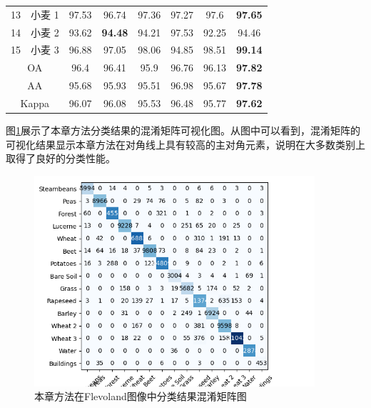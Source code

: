 \begin{table}[ht!]
\begin{tabular}{cccccccc}
        13                        & 小麦 1  & 97.53          & 96.74          & 97.36          & 97.27          & 97.6           & \textbf{97.65} \\
        14                        & 小麦 2  & 93.62          & \textbf{94.48} & 94.21          & 97.53          & 92.25          & 94.46          \\
        15                        & 小麦 3  & 96.88          & 97.05          & 98.06          & 94.85          & 98.51          & \textbf{99.14} \\
        \midrule[0.75bp]
        \multicolumn{2}{c}{OA}    & 96.4  & 96.41          & 95.9           & 96.76          & 96.13          & \textbf{97.82}                  \\
        \multicolumn{2}{c}{AA}    & 95.68 & 95.93          & 95.51          & 96.98          & 95.67          & \textbf{97.78}                  \\
        \multicolumn{2}{c}{Kappa} & 96.07 & 96.08          & 95.53          & 96.48          & 95.77          & \textbf{97.62}                  \\
        \bottomrule[1.5bp]
    \end{tabular}
\end{table}

图\ref{fig:fle_conf_matrix}展示了本章方法分类结果的混淆矩阵可视化图。从图中可以看到，混淆矩阵的可视化结果显示本章方法在对角线上具有较高的主对角元素，说明在大多数类别上取得了良好的分类性能。

\begin{figure}[h]
    \centering
    \includegraphics[width=10.4cm]{pic/chapter3/fle/conf-matrix.png}
    \caption{本章方法在Flevoland图像中分类结果混淆矩阵图}
    \label{fig:fle_conf_matrix}
\end{figure}


